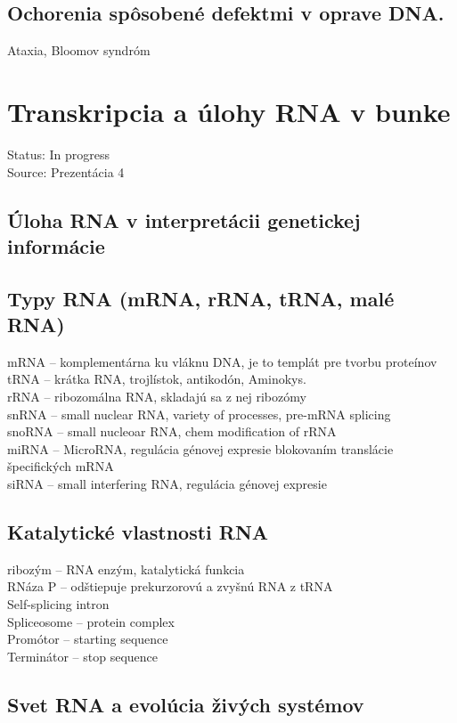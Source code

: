 \subsection{Ochorenia spôsobené defektmi v oprave DNA. }
Ataxia, Bloomov syndróm

\section{Transkripcia a úlohy RNA v bunke}

Status: In progress\\
Source: Prezentácia 4\\

\subsection{Úloha RNA v interpretácii genetickej informácie}

\subsection{Typy RNA (mRNA, rRNA, tRNA, malé RNA)}
mRNA -- komplementárna ku vláknu DNA, je to templát pre tvorbu proteínov\\
tRNA -- krátka RNA, trojlístok, antikodón, Aminokys. \\
rRNA -- ribozomálna RNA, skladajú sa z nej ribozómy\\
snRNA -- small nuclear RNA, variety of processes, pre-mRNA splicing\\
snoRNA -- small nucleoar RNA, chem modification of rRNA\\
miRNA -- MicroRNA, regulácia génovej expresie blokovaním translácie špecifických mRNA\\
siRNA -- small interfering RNA, regulácia génovej expresie\\
\subsection{Katalytické vlastnosti RNA}
ribozým -- RNA enzým, katalytická funkcia\\
RNáza P -- odštiepuje prekurzorovú a zvyšnú RNA z tRNA\\
Self-splicing intron\\
Spliceosome -- protein complex\\
Promótor -- starting sequence\\
Terminátor -- stop sequence\\
\subsection{Svet RNA a evolúcia živých systémov}

